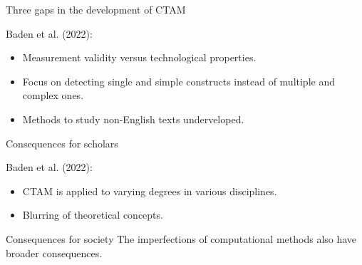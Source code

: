 \documentclass[compress]{beamer}
\begin{document}
\begin{frame}{Three gaps in the development of CTAM}
	
\begin{alertblock}{Baden et al. (2022):}
\begin{itemize}
\item Measurement validity versus technological properties.
\item Focus on detecting single and simple constructs instead of multiple and complex ones.
\item Methods to study non-English texts underveloped. 
\end{itemize}
\end{alertblock}	

\end{frame}



\begin{frame}{Consequences for scholars}
	
\begin{alertblock}{Baden et al. (2022):}
\begin{itemize}
	\item CTAM is applied to varying degrees in various disciplines.
	\item Blurring of theoretical concepts.
\end{itemize}
\end{alertblock}
	
	
	
\end{frame}


\begin{frame}{Consequences for society}
The imperfections of computational methods also have broader consequences.

\end{frame}
\end{document}
